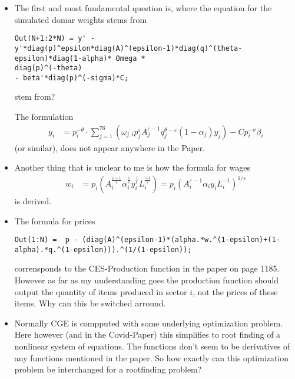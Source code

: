 \documentclass[a4paper,10pt]{article}
\title{}
\author{}
\begin{document}
\maketitle

\begin{itemize}
 \item The first and most fundamental question is, where the equation for the
simulated domar weights stems from
 \begin{lstlisting}
Out(N+1:2*N) = y' -
y'*diag(p)^epsilon*diag(A)^(epsilon-1)*diag(q)^(theta-
epsilon)*diag(1-alpha)* Omega *
diag(p)^(-theta)
- beta'*diag(p)^(-sigma)*C;
    \end{lstlisting}
stem from?

The formulation  \begin{align}
                 y_i &= p_i^{-\theta} \cdot \sum_{j=1}^{76} (\omega_{j,i} p_j^\varepsilon A_j^{\varepsilon -1} q_j^{\theta - \varepsilon} (1 - \alpha_j) y_j) - C p_i^{-\sigma} \beta_i
                \end{align}
(or similar), does not appear anywhere in the Paper.
\item Another thing that is unclear to me is how the formula for wages
                \begin{align}
                                          w_i &= p_i (A_i ^ {\frac{\varepsilon -1}{\epsilon}} \alpha_i ^ {\frac 1 \varepsilon} y_i ^ {\frac 1 \varepsilon} L_i ^ {\frac {-1}{\varepsilon}}) = p_i (A_i^{\varepsilon-1}\alpha_i y_i L_i^{-1})^{1/\varepsilon}
                \end{align}
      is derived.
\item The formula for prices \begin{lstlisting}
Out(1:N) =  p - (diag(A)^(epsilon-1)*(alpha.*w.^(1-epsilon)+(1-alpha).*q.^(1-epsilon))).^(1/(1-epsilon));
                             \end{lstlisting}
corrensponds to the CES-Production function in the paper on page 1185. However as far as my understanding goes the production function should output the quantity of items produced in sector $i$, not the prices of these items. Why can this be switched arround.
\item Normally CGE is compputed with some underlying optimization problem. Here however (and in the Covid-Paper) this simplifies to root finding of a nonlinear system of equations. The functions don't seem to be derivatives of any functions mentioned in the paper. So how exactly can this optimization problem be interchanged for a rootfinding problem?

\end{itemize}
\end{document}
